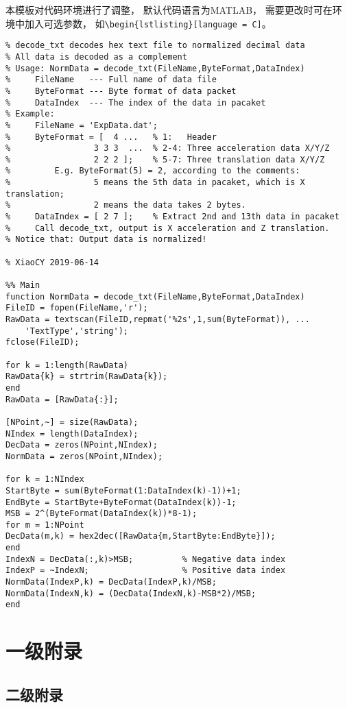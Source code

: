 \documentclass{springdoc}
\begin{document}
	本模板对代码环境进行了调整，
	默认代码语言为MATLAB，
	需要更改时可在环境中加入可选参数，
	如\verb|\begin{lstlisting}[language = C]|。
	
	
\begin{lstlisting}
% decode_txt decodes hex text file to normalized decimal data
% All data is decoded as a complement
% Usage: NormData = decode_txt(FileName,ByteFormat,DataIndex)
%     FileName   --- Full name of data file
%     ByteFormat --- Byte format of data packet
%     DataIndex  --- The index of the data in pacaket
% Example:
%     FileName = 'ExpData.dat';
%     ByteFormat = [  4 ...   % 1:   Header
%                 3 3 3  ...  % 2-4: Three acceleration data X/Y/Z
%                 2 2 2 ];    % 5-7: Three translation data X/Y/Z
%         E.g. ByteFormat(5) = 2, according to the comments:
%                 5 means the 5th data in pacaket, which is X translation;
%                 2 means the data takes 2 bytes.
%     DataIndex = [ 2 7 ];    % Extract 2nd and 13th data in pacaket
%     Call decode_txt, output is X acceleration and Z translation.
% Notice that: Output data is normalized!

% XiaoCY 2019-06-14

%% Main
function NormData = decode_txt(FileName,ByteFormat,DataIndex)
FileID = fopen(FileName,'r');
RawData = textscan(FileID,repmat('%2s',1,sum(ByteFormat)), ...
	'TextType','string');
fclose(FileID);

for k = 1:length(RawData)
RawData{k} = strtrim(RawData{k});
end
RawData = [RawData{:}];

[NPoint,~] = size(RawData);
NIndex = length(DataIndex);
DecData = zeros(NPoint,NIndex);
NormData = zeros(NPoint,NIndex);

for k = 1:NIndex
StartByte = sum(ByteFormat(1:DataIndex(k)-1))+1;
EndByte = StartByte+ByteFormat(DataIndex(k))-1;
MSB = 2^(ByteFormat(DataIndex(k))*8-1);
for m = 1:NPoint
DecData(m,k) = hex2dec([RawData{m,StartByte:EndByte}]);
end
IndexN = DecData(:,k)>MSB;          % Negative data index
IndexP = ~IndexN;                   % Positive data index       
NormData(IndexP,k) = DecData(IndexP,k)/MSB;
NormData(IndexN,k) = (DecData(IndexN,k)-MSB*2)/MSB;
end
\end{lstlisting}
	
	
	
	\appendix
	
	\section{一级附录}
	\subsection{二级附录}
\end{document}
